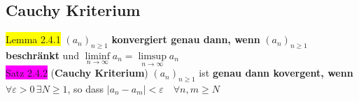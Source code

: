 \documentclass[landscape, 10pt]{article}
\begin{document}
\begin{multicols}{3}
       \subsection{Cauchy Kriterium}
              \colorbox{yellow}{Lemma 2.4.1} 
                     $(a_n)_{n\geqslant1}$ \textbf{konvergiert genau dann, wenn} 
                     \textcolor{NavyBlue}{$(a_n)_{n\geqslant1}$} 
                     \textbf{beschränkt} und 
                     \textcolor{NavyBlue}{$\liminf\limits_{n\to\infty}a_n
                     =\limsup\limits_{n\to\infty}a_n$}\\
              \colorbox{magenta}{Satz 2.4.2} 
              (\textbf{Cauchy Kriterium})
                      $(a_n)_{n\geqslant1}$ ist
                     \textbf{genau dann kovergent, wenn} 
                     \textcolor{NavyBlue}{
                     $\forall\varepsilon >0\,\exists N\geqslant1$}, 
                     so dass \textcolor{NavyBlue}{
                     $|a_n-a_m|<\varepsilon\quad\forall n,m\geqslant N$}

\end{multicols}
\end{document}
